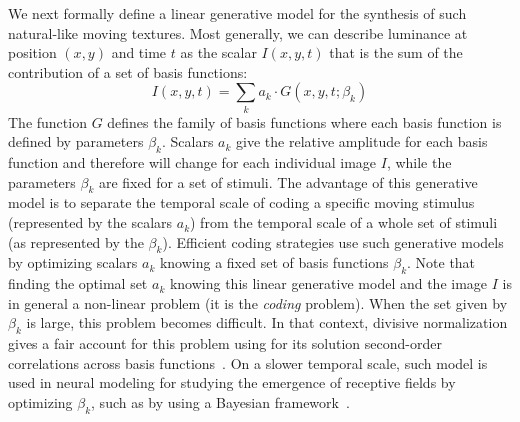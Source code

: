 \documentclass[a4paper,11pt]{article}%
\begin{document}
We next formally define a linear generative model for the synthesis of such natural-like moving textures. Most generally, we can describe luminance at position $(x,y)$ and time $t$ as the scalar $I(x, y, t)$ that is the sum of the contribution of a set of basis functions:
\begin{equation}%
I(x, y, t) = \sum_k a_k \cdot G(x, y, t; \beta_k) \label{eq:gen1}%
\end{equation}%
The function $G$ defines the family of basis functions where each basis function is defined by parameters $\beta_k$. Scalars $a_k$ give the relative amplitude for each basis function and therefore will change for each individual image $I$, while the parameters $\beta_k$ are fixed for a set of stimuli. The advantage of this generative model is to separate the temporal scale of coding a specific moving stimulus (represented by the scalars $a_k$) from the temporal scale of a whole set of stimuli (as represented by the $\beta_k$). Efficient coding strategies use such generative models by optimizing scalars $a_k$ knowing a fixed set of basis functions $\beta_k$. %
Note that finding the optimal set $a_k$ knowing this linear generative model and the image $I$ is in general a non-linear problem (it is the \emph{coding} problem). When the set given by $\beta_k$ is large, this problem becomes difficult. %
In that context, divisive normalization gives a fair account for this problem using for its solution second-order correlations across basis functions~\citep{Schwartz01}. On a slower temporal scale, such model is used in neural modeling for studying the emergence of receptive fields by optimizing $\beta_k$, such as by using a Bayesian framework~\citep{Perrinet10shl}. %
\end{document}
